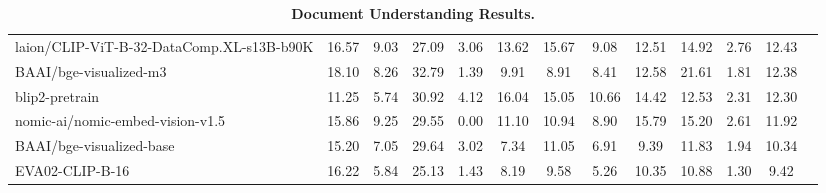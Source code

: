 \begin{table*}
{\begin{tabular}{lcccccccccccc}
laion/CLIP-ViT-B-32-DataComp.XL-s13B-b90K &16.57 &9.03 &27.09 &3.06 &13.62 &15.67 &9.08 &12.51 &14.92 &2.76 &12.43 \\
BAAI/bge-visualized-m3 &18.10 &8.26 &32.79 &1.39 &9.91 &8.91 &8.41 &12.58 &21.61 &1.81 &12.38 \\
blip2-pretrain &11.25 &5.74 &30.92 &4.12 &16.04 &15.05 &10.66 &14.42 &12.53 &2.31 &12.30 \\
nomic-ai/nomic-embed-vision-v1.5 &15.86 &9.25 &29.55 &0.00 &11.10 &10.94 &8.90 &15.79 &15.20 &2.61 &11.92 \\
BAAI/bge-visualized-base &15.20 &7.05 &29.64 &3.02 &7.34 &11.05 &6.91 &9.39 &11.83 &1.94 &10.34 \\
EVA02-CLIP-B-16 &16.22 &5.84 &25.13 &1.43 &8.19 &9.58 &5.26 &10.35 &10.88 &1.30 &9.42 \\
\bottomrule
\end{tabular}}
\caption{\textbf{Document Understanding Results.}}\label{tab: doc understanding}
\end{table*}